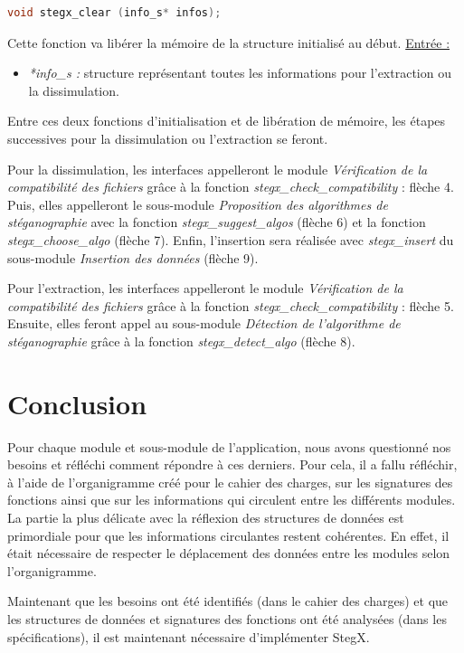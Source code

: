 \documentclass[11pt]{article}
\begin{document}
\begin{lstlisting}[language=c]
void stegx_clear (info_s* infos);
\end{lstlisting}

Cette fonction va libérer la mémoire de la structure initialisé au début. 
\newline
\underline{Entrée :} 
\begin{itemize}
\item \textit{*info\_s :} structure représentant toutes les informations 
pour l'extraction ou la dissimulation. 
\end{itemize} 

Entre ces deux fonctions d'initialisation et de libération de mémoire, 
les étapes successives pour la dissimulation ou l'extraction se feront. 

Pour la dissimulation, les interfaces appelleront le module 
\textit{Vérification de la compatibilité des fichiers} grâce à la fonction 
\textit{stegx\_check_compatibility} : flèche 4. 
Puis, elles appelleront le sous-module 
\textit{Proposition des algorithmes de stéganographie} avec la fonction 
\textit{stegx\_suggest\_algos} (flèche 6) et la fonction 
\textit{stegx\_choose\_algo} (flèche 7). 
Enfin, l'insertion sera réalisée avec \textit{stegx\_insert} du sous-module 
\textit{Insertion des données} (flèche 9). 

Pour l'extraction, les interfaces appelleront le module 
\textit{Vérification de la compatibilité des fichiers} grâce à la fonction 
\textit{stegx\_check_compatibility} : flèche 5. 
Ensuite, elles feront appel au sous-module 
\textit{Détection de l'algorithme de stéganographie} grâce à la fonction 
\textit{stegx\_detect\_algo} (flèche 8).

\section{Conclusion}

Pour chaque module et sous-module de l'application, nous avons questionné nos 
besoins et réfléchi comment répondre à ces derniers. Pour cela, il a fallu 
réfléchir, à l'aide de l'organigramme créé pour le cahier des charges, 
sur les signatures des fonctions ainsi que sur les informations qui circulent 
entre les différents modules. 
La partie la plus délicate avec la réflexion des structures de données 
est primordiale pour que les informations circulantes restent cohérentes. 
En effet, il était nécessaire de respecter le déplacement des données entre 
les modules selon l'organigramme. 

Maintenant que les besoins ont été identifiés (dans le cahier des charges) 
et que les structures de données et signatures des fonctions ont été 
analysées (dans les spécifications), il est maintenant nécessaire 
d'implémenter StegX. 
\end{document}
